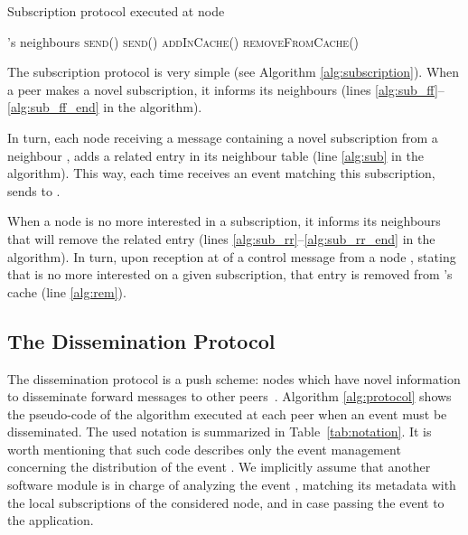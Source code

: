 \documentclass[10pt, conference, compsocconf]{IEEEtran}
\begin{document}
\begin{algorithm}[t]
\caption{Subscription protocol executed at node }
\label{alg:subscription}
\begin{small}
\begin{algorithmic}[1]
\STATE 's neighbours 
\STATE
{}\label{alg:sub_ff}
\STATE 
\FORALL{} \hfill{}
   \STATE \textsc{send}()\ENDFOR \label{alg:sub_ff_end}
\STATE
{}\label{alg:sub_rr}
\STATE 
\FORALL{} \hfill{}
  \STATE \textsc{send}()\ENDFOR \label{alg:sub_rr_end}
\STATE
{}
\STATE \textsc{addInCache}()\hfill{}\label{alg:sub}
\ELSE \hfill{}\label{alg:sub_rr_sent}
\STATE \textsc{removeFromCache}()\label{alg:rem}
\ENDIF
\end{algorithmic}
\end{small}
\end{algorithm}


The subscription protocol is very simple (see Algorithm \ref{alg:subscription}). When a peer  makes a novel subscription, it informs its neighbours (lines \ref{alg:sub_ff}--\ref{alg:sub_ff_end} in the algorithm). 

In turn, each node  receiving a message containing a novel subscription from a neighbour , adds a related entry in its neighbour table (line \ref{alg:sub} in the algorithm). This way, each time  receives an event  matching this subscription,  sends  to .

When a node is no more interested in a subscription, it informs its neighbours that will remove the related entry (lines \ref{alg:sub_rr}--\ref{alg:sub_rr_end} in the algorithm). In turn, upon reception at  of a control message from a node , stating that  is no more interested on a given subscription, that entry is removed from 's cache (line \ref{alg:rem}).


\subsection{The Dissemination Protocol}

The dissemination protocol
is a push scheme: nodes which have novel information to disseminate forward messages to other peers~\cite{disio11,disio10}. 
Algorithm \ref{alg:protocol} shows the pseudo-code of the algorithm executed at each peer  when an event  must be disseminated. The used notation is summarized in Table~\ref{tab:notation}.
It is worth mentioning that such code describes only the event management concerning the distribution of the event . We implicitly assume that another software module is in charge of analyzing the event , matching its metadata with the local subscriptions of the considered node, and in case passing the event to the application.
\end{document}
